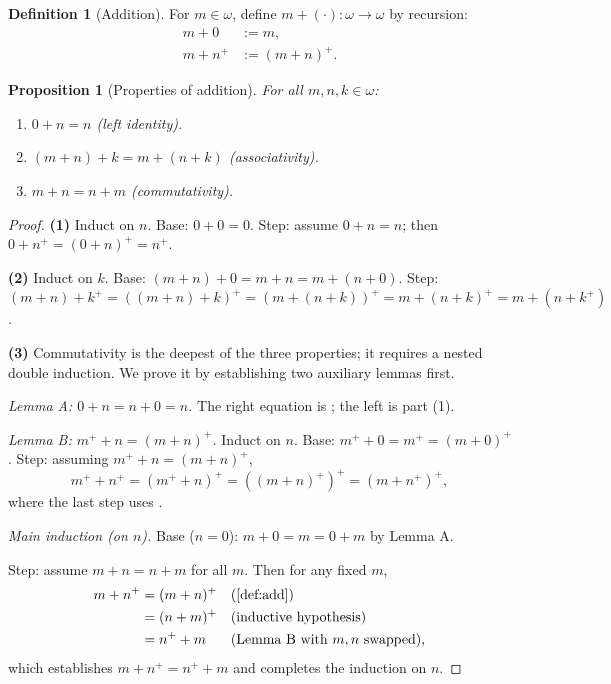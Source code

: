 \documentclass[12pt]{article}
\newtheorem{proposition}[theorem]{Proposition}
\theoremstyle{definition}
\newtheorem{definition}[theorem]{Definition}
\theoremstyle{remark}
\begin{document}
\begin{definition}[Addition]\label{def:add}
For $m \in \omega$, define $m + (\cdot) : \omega \to \omega$ by recursion:
\begin{align}
m + 0 &:= m, \\
m + n^+ &:= (m + n)^+.
\end{align}
\end{definition}

\begin{proposition}[Properties of addition]\label{prop:add-props}
For all $m, n, k \in \omega$:
\begin{enumerate}
\item $0 + n = n$ (left identity).
\item $(m + n) + k = m + (n + k)$ (associativity).
\item $m + n = n + m$ (commutativity).
\end{enumerate}
\end{proposition}

\begin{proof}
\textbf{(1)} Induct on $n$. Base: $0 + 0 = 0$. Step: assume $0 + n = n$;
then $0 + n^+ = (0 + n)^+ = n^+$.

\textbf{(2)} Induct on $k$. Base: $(m+n) + 0 = m + n = m + (n + 0)$. Step:
$(m+n) + k^+ = ((m+n) + k)^+ = (m + (n+k))^+ = m + (n+k)^+ = m + (n + k^+)$.

\textbf{(3)} Commutativity is the deepest of the three properties; it
requires a nested double induction. We prove it by establishing two
auxiliary lemmas first.

\emph{Lemma A: $0 + n = n + 0 = n$.} The right equation is
; the left is part (1).

\emph{Lemma B: $m^+ + n = (m + n)^+$.} Induct on $n$. Base:
$m^+ + 0 = m^+ = (m + 0)^+$. Step: assuming $m^+ + n = (m + n)^+$,
\[
m^+ + n^+ = (m^+ + n)^+ = ((m+n)^+)^+ = (m + n^+)^+,
\]
where the last step uses .

\emph{Main induction (on $n$).} Base ($n = 0$): $m + 0 = m = 0 + m$ by Lemma A.

Step: assume $m + n = n + m$ for all $m$. Then for any fixed $m$,
\begin{align*}
m + n^+ &= (m + n)^+ &&\text{(\Cref{def:add})} \\
        &= (n + m)^+ &&\text{(inductive hypothesis)} \\
        &= n^+ + m &&\text{(Lemma B with $m, n$ swapped)},
\end{align*}
which establishes $m + n^+ = n^+ + m$ and completes the induction on $n$.
\end{proof}
\end{document}
